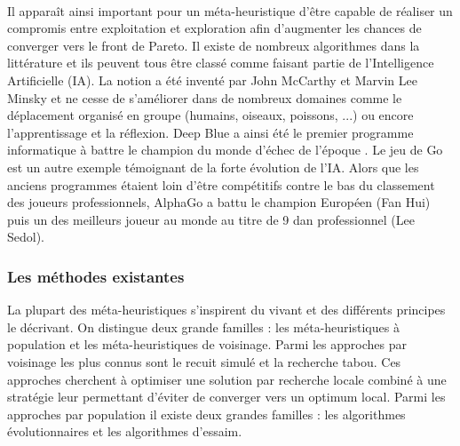 \paragraph{} %
Il apparaît ainsi important pour un méta-heuristique d’être capable de réaliser
un compromis entre exploitation et exploration afin d’augmenter les chances de
converger vers le front de Pareto. Il existe de nombreux algorithmes dans la littérature
et ils peuvent tous être classé comme faisant partie de l’Intelligence Artificielle (IA).
La notion a été inventé par John McCarthy et Marvin Lee Minsky et ne cesse de s’améliorer
dans de nombreux domaines comme le déplacement organisé en groupe (humains, oiseaux, poissons, ...)
ou encore l’apprentissage et la réflexion. Deep Blue a ainsi été le premier programme
informatique à battre le champion du monde d’échec de l’époque \parencite{Hsu199970}.
Le jeu de Go est un autre exemple témoignant de la forte évolution de l’IA. Alors que
les anciens programmes étaient loin d’être compétitifs contre le bas du classement
des joueurs professionnels, AlphaGo \parencite{Silver2016484} a battu le champion Européen (Fan Hui)
puis un des meilleurs joueur au monde au titre de 9 dan professionnel (Lee Sedol).


\subsubsection{Les méthodes existantes} %
\label{ssub:les_methodes_existantes}
La plupart des méta-heuristiques s’inspirent du vivant et des différents principes
le décrivant. On distingue deux grande familles : les méta-heuristiques à population
et les méta-heuristiques de voisinage. Parmi les approches par voisinage les plus
connus sont le recuit simulé et la recherche tabou. Ces approches cherchent à optimiser
une solution par recherche locale combiné à une stratégie leur permettant d’éviter
de converger vers un optimum local. Parmi les approches par population il existe
deux grandes familles : les algorithmes évolutionnaires et les algorithmes d’essaim.

